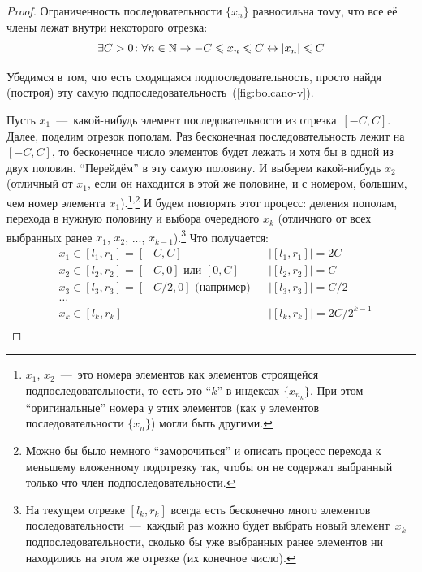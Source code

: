 \documentclass[a4paper,12pt]{article}
\begin{document}
  \begin{proof}
    Ограниченность последовательности $\{x_n\}$ равносильна тому, что все её члены лежат внутри некоторого отрезка:
    \[
      \exists C > 0\colon \forall n \in \mathbb N \to -C \leqslant x_n \leqslant C \leftrightarrow |x_n| \leqslant C
    \]
    
    Убедимся в том, что есть сходящаяся подпоследовательность, просто найдя (построя) эту самую подпоследовательность~(\ref{fig:bolcano-v}).
    
    Пусть $x_1$~---~какой-нибудь элемент последовательности из отрезка~$[-C, C]$.
    Далее, поделим отрезок пополам.
    Раз бесконечная последовательность лежит на $[-C, C]$, то бесконечное число элементов будет лежать и хотя бы в одной из двух половин.
    ``Перейдём'' в эту самую половину.
    И выберем какой-нибудь $x_2$ (отличный от $x_1$, если он находится в этой же половине, и с номером, большим, чем номер элемента $x_1$).\footnote{
      $x_1$, $x_2$~---~это номера элементов как элементов строящейся подпоследовательности, то есть это ``$k$'' в индексах $\{x_{n_k}\}$.
      При этом ``оригинальные'' номера у этих элементов (как у элементов последовательности $\{x_n\}$) могли быть другими.
    }\textsuperscript{,}\footnote{
      Можно бы было немного ``заморочиться'' и описать процесс перехода к меньшему вложенному подотрезку так, чтобы он не содержал выбранный только что член подпоследовательности.
    }
    И будем повторять этот процесс: деления пополам, перехода в нужную половину и выбора очередного $x_k$ (отличного от всех выбранных ранее $x_1$, $x_2$, ..., $x_{k - 1}$).\footnote{
      На текущем отрезке $[l_k, r_k]$ всегда есть бесконечно много элементов последовательности~---~каждый раз можно будет выбрать новый элемент~$x_k$ подпоследовательности, сколько бы уже выбранных ранее элементов ни находились на этом же отрезке (их конечное число).
    }
    Что получается:
    \[
      \begin{aligned}
        &x_1 \in [l_1, r_1] = [-C, C]                        & &\bigl|[l_1, r_1]\bigr| = 2C\\
        &x_2 \in [l_2, r_2] = [-C, 0] \mbox{ или } [0, C]    & &\bigl|[l_2, r_2]\bigr| = C\\
        &x_3 \in [l_3, r_3] = [-C/2, 0] \mbox{ (например)}   & &\bigl|[l_3, r_3]\bigr| = C/2\\
        &\ldots\\
        &x_k \in [l_k, r_k]                                  & &\bigl|[l_k, r_k]\bigr| = 2C/2^{k - 1}\\
      \end{aligned}
    \]
    

\end{proof}
\end{document}
